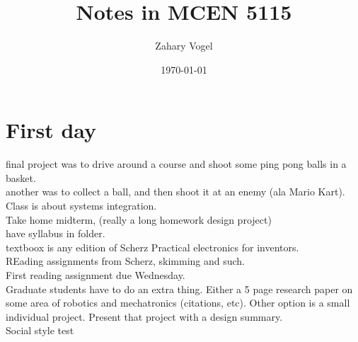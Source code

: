 \documentclass{article}
\author{Zahary Vogel}
\date{\today}
\title{Notes in MCEN 5115}
\begin{document}
\maketitle


\section*{First day}
final project was to drive around a course and shoot some ping pong balls in a basket.\\
another was to collect a ball, and then shoot it at an enemy (ala Mario Kart).\\
Class is about systems integration.\\
Take home midterm, (really a long homework design project)\\
have syllabus in folder.\\
textboox is any edition of Scherz Practical electronics for inventors.\\
REading assignments from Scherz, skimming and such.\\
First reading assignment due Wednesday.\\
Graduate students have to do an extra thing. Either a 5 page research paper on some area of robotics and mechatronics (citations, etc). Other option is a small individual project. Present that project with a design summary.\\
Social style test
\end{document}
